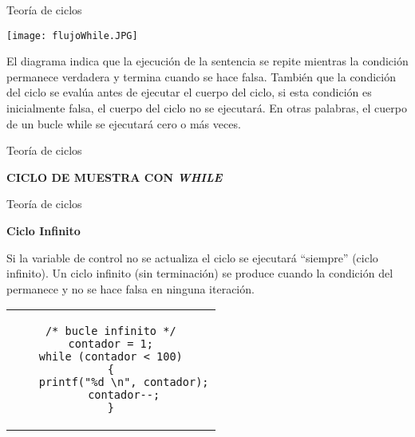 \begin{frame}[t]{Teoría de ciclos}
    \vspace{-5mm}
    \begin{center}\texttt{[image: flujoWhile.JPG]}\vspace{-5mm}\end{center}
    \justify
    \hspace{5mm}
    El diagrama indica que la ejecución de la sentencia se repite mientras la condición permanece verdadera y termina cuando se hace falsa. También que la condición del ciclo se evalúa antes de ejecutar el cuerpo del ciclo, si esta condición es inicialmente falsa, el cuerpo del ciclo no se ejecutará. En otras palabras, el cuerpo de un bucle while se ejecutará cero o más veces.
\end{frame}



\begin{frame}[fragile]{Teoría de ciclos}
\begin{center}
    \textbf{CICLO DE MUESTRA CON \textit{WHILE}}
\end{center}

\end{frame}



\begin{frame}[fragile]{Teoría de ciclos}
    \begin{center}
        \textbf{Ciclo Infinito}
    \end{center}
    \justify
    Si la variable de control no se actualiza el ciclo se ejecutará “siempre” (ciclo infinito). Un ciclo infinito (sin terminación) se produce cuando la condición del permanece y no se hace falsa en ninguna iteración.
    \vspace{-2mm}
\begin{center}
    \begin{tabular}{c}
            \begin{lstlisting}
/* bucle infinito */
contador = 1;
while (contador < 100)
{
    printf("%d \n", contador);
    contador--;
}
\end{lstlisting}
    \end{tabular}
\end{center}
\end{frame}


